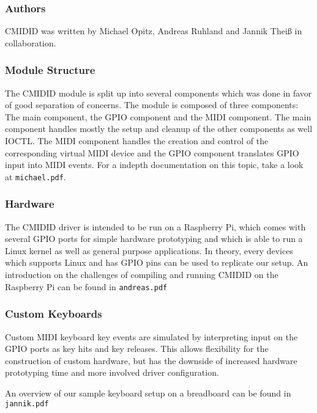 \documentclass[paper=a4,fontsize=11pt,twocolumn,pagesize,bibtotoc]{scrartcl}
\begin{document}
\subsubsection{Authors}
\label{cmidid:authors}

CMIDID was written by Michael Opitz, Andreas Ruhland and Jannik Theiß in 
collaboration.

\subsubsection{Module Structure}
\label{cmidid:structure}

The CMIDID module is split up into several components which was done in 
favor of good separation of concerns. The module is composed of three 
components: The main component, the GPIO component and the MIDI component.
The main component handles mostly the setup and cleanup of the other 
components as well IOCTL. The MIDI component handles the creation and control 
of the corresponding virtual MIDI device and the GPIO component translates 
GPIO input into MIDI events. For a indepth documentation on this topic, take 
a look at \texttt{michael.pdf}.

\subsubsection{Hardware}
\label{cmidid:hardware}

The CMIDID driver is intended to be run on a Raspberry Pi, which comes with 
several GPIO ports for simple hardware prototyping and which is able to run 
a Linux kernel as well as general purpose applications. In theory, every 
devices which supports Linux and has GPIO pins can be used to replicate our 
setup. 
An introduction on the challenges of compiling and running CMIDID on the 
Raspberry Pi can be found in \texttt{andreas.pdf}
\subsubsection{Custom Keyboards}
\label{cmidid:keyboards}

Custom MIDI keyboard key events are simulated by interpreting input on the 
GPIO ports as key hits and key releases. This allows flexibility for the 
construction of custom hardware, but has the downside of increased hardware 
prototyping time and more involved driver configuration.

An overview of our sample keyboard setup on a breadboard can be found in \texttt{jannik.pdf}
\end{document}
